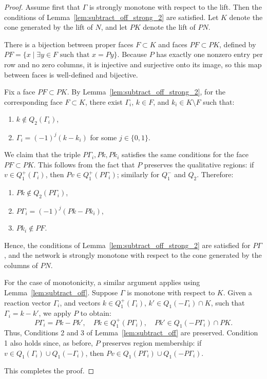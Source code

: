 \documentclass{article}
\begin{document}
\begin{proof}
Assume first that \( \Gamma \) is strongly monotone with respect to the lift. Then the conditions of Lemma~\ref{lem:subtract_off_strong_2} are satisfied. Let \( K \) denote the cone generated by the lift of \( N \), and let \( PK \) denote the lift of \( PN \).

There is a bijection between proper faces \( F \subset K \) and faces \( PF \subset PK \), defined by \( PF = \{x \mid \exists y \in F \text{ such that } x = Py \} \). Because \( P \) has exactly one nonzero entry per row and no zero columns, it is injective and surjective onto its image, so this map between faces is well-defined and bijective.

Fix a face \( PF \subset PK \). By Lemma~\ref{lem:subtract_off_strong_2}, for the corresponding face \( F \subset K \), there exist \( \Gamma_i \), \( k \in F \), and \( k_i \in K \setminus F \) such that:
\begin{enumerate}
    \item \( k \notin Q_2(\Gamma_i) \),
    \item \( \Gamma_i = (-1)^j(k - k_i) \) for some \( j \in \{0,1\} \).
\end{enumerate}

We claim that the triple \( P\Gamma_i, Pk, Pk_i \) satisfies the same conditions for the face \( PF \subset PK \). This follows from the fact that \( P \) preserves the qualitative regions: if \( v \in Q_1^+(\Gamma_i) \), then \( Pv \in Q_1^+(P\Gamma_i) \); similarly for \( Q_1^- \) and \( Q_2 \). Therefore:
\begin{enumerate}
    \item \( Pk \notin Q_2(P\Gamma_i) \),
    \item \( P\Gamma_i = (-1)^j(Pk - Pk_i) \),
    \item \( Pk_i \notin PF \).
\end{enumerate}

Hence, the conditions of Lemma~\ref{lem:subtract_off_strong_2} are satisfied for \( P\Gamma \), and the network is strongly monotone with respect to the cone generated by the columns of \( PN \).

For the case of monotonicity, a similar argument applies using Lemma~\ref{lem:subtract_off}. Suppose \( \Gamma \) is monotone with respect to \( K \). Given a reaction vector \( \Gamma_i \), and vectors \( k \in Q_1^+(\Gamma_i) \), \( k' \in Q_1(-\Gamma_i) \cap K \), such that \( \Gamma_i = k - k' \), we apply \( P \) to obtain:
\[
P\Gamma_i = Pk - Pk', \quad Pk \in Q_1^+(P\Gamma_i), \quad Pk' \in Q_1(-P\Gamma_i) \cap PK.
\]
Thus, Conditions 2 and 3 of Lemma~\ref{lem:subtract_off} are preserved. Condition 1 also holds since, as before, \( P \) preserves region membership: if \( v \in Q_1(\Gamma_i) \cup Q_1(-\Gamma_i) \), then \( Pv \in Q_1(P\Gamma_i) \cup Q_1(-P\Gamma_i) \).

This completes the proof.
\end{proof}
\end{document}
